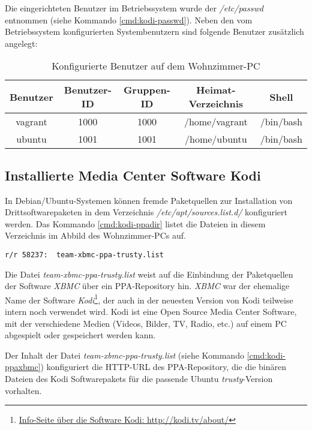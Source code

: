 Die eingerichteten Benutzer im Betriebssystem wurde der \textit{/etc/passwd} entnommen (siehe Kommando \autoref{cmd:kodi-passwd}). Neben den vom Betriebssystem konfigurierten Systembenutzern sind folgende Benutzer zusätzlich angelegt:

\begin{table}[H]
\centering
\begin{tabular}{ccccc}
\hline 
Benutzer & Benutzer-ID & Gruppen-ID & Heimat-Verzeichnis & Shell \\ 
\hline 
vagrant & 1000 & 1000 & /home/vagrant & /bin/bash \\ 
\hline 
ubuntu & 1001 & 1001 & /home/ubuntu & /bin/bash \\ 
\hline 
\end{tabular} 
\caption{Konfigurierte Benutzer auf dem Wohnzimmer-PC}
\end{table}

\subsection{Installierte Media Center Software Kodi}

In Debian/Ubuntu-Systemen können fremde Paketquellen zur Installation von Drittsoftwarepaketen in dem Verzeichnis \textit{/etc/apt/sources.list.d/} konfiguriert werden. Das Kommando \autoref{cmd:kodi-ppadir} listet die Dateien in diesem Verzeichnis im Abbild des Wohnzimmer-PCs auf.

\begin{cmd}[H]
\begin{verbatim}
r/r 58237:	team-xbmc-ppa-trusty.list
\end{verbatim}
\caption{fls -o 2048 kodi.raw 1289}
\label{cmd:kodi-ppadir}
\end{cmd}

Die Datei \textit{team-xbmc-ppa-trusty.list} weist auf die Einbindung der Paketquellen der Software \textit{XBMC} über ein PPA-Repository hin. \textit{XBMC} war der ehemalige Name der Software \textit{Kodi}\footnote{\href{http://kodi.tv/about/}{Info-Seite über die Software Kodi: http://kodi.tv/about/}}, der auch in der neuesten Version von Kodi teilweise intern noch verwendet wird. Kodi ist eine Open Source Media Center Software, mit der verschiedene Medien (Videos, Bilder, TV, Radio, etc.) auf einem PC abgespielt oder gespeichert werden kann.

Der Inhalt der Datei \textit{team-xbmc-ppa-trusty.list} (siehe Kommando \autoref{cmd:kodi-ppaxbmc}) konfiguriert die HTTP-URL des PPA-Repository, die die binären Dateien des Kodi Softwarepakets für die passende Ubuntu \textit{trusty}-Version vorhalten.

